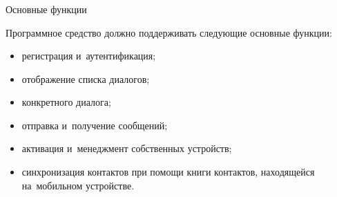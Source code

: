 \subsubsection{} Основные функции
\label{sec:analysis:research:req:functions}

Программное средство должно поддерживать следующие основные фун\-к\-ции:

\begin{itemize}
	\item регистрация и~аутентификация;
	\item отображение списка диалогов;
	\item конкретного диалога;
	\item отправка и~получение сообщений;
	\item активация и~менеджмент собственных устройств;
	\item синхронизация контактов при помощи книги контактов, находящейся на~мобильном устройстве.
\end{itemize}
